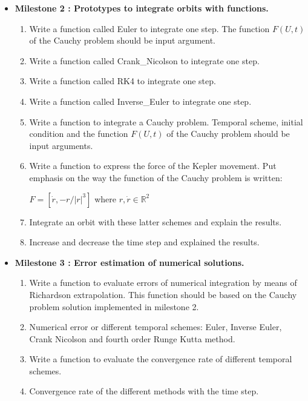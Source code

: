 \documentclass[12pt, a4paper]{article}
\begin{document}
\begin{itemize}

\item {\bf Milestone 2 : Prototypes to integrate orbits with functions. } 

\begin{enumerate} 
\item Write a function called Euler to integrate one step. 
The function  $F(U,t)$ of the Cauchy problem should be input argument.
\item Write a function called Crank\_Nicolson to integrate one step.
\item Write a function called RK4 to integrate one step.
\item Write a function called Inverse\_Euler to integrate one step.
\item Write a function to integrate a Cauchy problem. Temporal scheme, initial condition and 
the function $F(U,t)$ of the Cauchy problem should be input arguments.
\item Write a function to express the force of the Kepler movement.
Put emphasis on the way the function of the Cauchy problem is written: 

$ F = [ \dot r , -r/|r|^3 ] $ where $ r, \dot r \in \mathbb{R}^2 $ 

\item Integrate an orbit with these latter schemes and explain the results.
\item Increase and decrease the time step and explained the results. 
 
\end{enumerate} 



\item {\bf Milestone 3 : Error estimation of numerical solutions.} 


\begin{enumerate}

\item Write a function to evaluate errors of numerical integration by means of Richardson 
extrapolation. 
This function should be based on the Cauchy problem solution implemented in milestone 2. 
\item Numerical error or different temporal schemes:  
Euler, Inverse Euler, Crank Nicolson 
and  fourth order Runge Kutta method.  
\item Write a function to evaluate the convergence rate of different temporal schemes. 
\item Convergence rate of the different methods with the time step.   


\end{enumerate}
\end{itemize}
\end{document}
